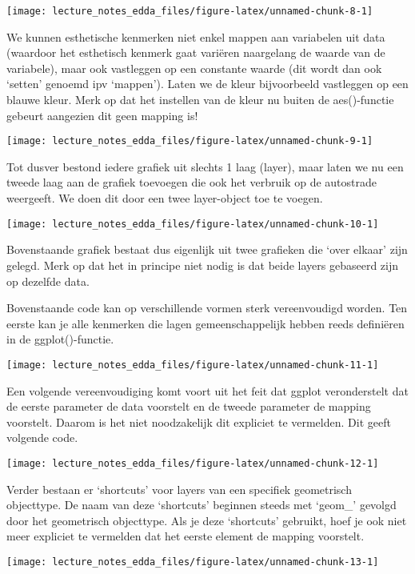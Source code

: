 \documentclass[]{memoir}
\begin{document}
\texttt{[image: lecture\_notes\_edda\_files/figure-latex/unnamed-chunk-8-1]}

We kunnen esthetische kenmerken niet enkel mappen aan variabelen uit data (waardoor het esthetisch kenmerk gaat variëren naargelang de waarde van de variabele), maar ook vastleggen op een constante waarde (dit wordt dan ook `setten' genoemd ipv `mappen'). Laten we de kleur bijvoorbeeld vastleggen op een blauwe kleur. Merk op dat het instellen van de kleur nu buiten de aes()-functie gebeurt aangezien dit geen mapping is!

\texttt{[image: lecture\_notes\_edda\_files/figure-latex/unnamed-chunk-9-1]}

Tot dusver bestond iedere grafiek uit slechts 1 laag (layer), maar laten we nu een tweede laag aan de grafiek toevoegen die ook het verbruik op de autostrade weergeeft. We doen dit door een twee layer-object toe te voegen.

\texttt{[image: lecture\_notes\_edda\_files/figure-latex/unnamed-chunk-10-1]}

Bovenstaande grafiek bestaat dus eigenlijk uit twee grafieken die `over elkaar' zijn gelegd. Merk op dat het in principe niet nodig is dat beide layers gebaseerd zijn op dezelfde data.

Bovenstaande code kan op verschillende vormen sterk vereenvoudigd worden. Ten eerste kan je alle kenmerken die lagen gemeenschappelijk hebben reeds definiëren in de ggplot()-functie.

\texttt{[image: lecture\_notes\_edda\_files/figure-latex/unnamed-chunk-11-1]}

Een volgende vereenvoudiging komt voort uit het feit dat ggplot veronderstelt dat de eerste parameter de data voorstelt en de tweede parameter de mapping voorstelt. Daarom is het niet noodzakelijk dit expliciet te vermelden. Dit geeft volgende code.

\texttt{[image: lecture\_notes\_edda\_files/figure-latex/unnamed-chunk-12-1]}

Verder bestaan er `shortcuts' voor layers van een specifiek geometrisch objecttype. De naam van deze `shortcuts' beginnen steeds met `geom\_' gevolgd door het geometrisch objecttype. Als je deze `shortcuts' gebruikt, hoef je ook niet meer expliciet te vermelden dat het eerste element de mapping voorstelt.

\texttt{[image: lecture\_notes\_edda\_files/figure-latex/unnamed-chunk-13-1]}
\end{document}
